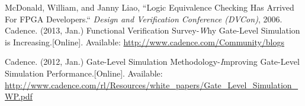 \begin{thebibliography}{10}
McDonald, William, and Janny Liao,
	``Logic Equivalence Checking Has Arrived For FPGA Developers.`` \emph{Design and Verification Conference (DVCon)}, 2006.
%
%
%
%
% 
% 
\BIBentryALTinterwordspacing
Cadence. (2013, Jan.) {Functional Verification Survey-{\emph Why Gate-Level Simulation is Increasing}}.[Online]. Available:
\url {http://www.cadence.com/Community/blogs}
\BIBentrySTDinterwordspacing

\BIBentryALTinterwordspacing
Cadence. (2012, Jan.) {Gate-Level Simulation Methodology-{\emph Improving Gate-Level Simulation Performance}}.[Online]. Available:
\url {http://www.cadence.com/rl/Resources/white_papers/Gate_Level_Simulation_WP.pdf}
\BIBentrySTDinterwordspacing



\end{thebibliography}
